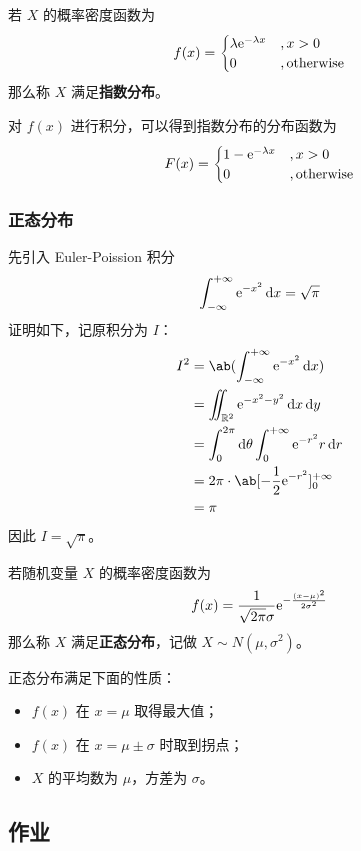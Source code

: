 \begin{definition}
    若 $X$ 的概率密度函数为
    $$
    f(x) = \begin{cases}
        \lambda \mathrm{e}^{-\lambda x} &, x > 0 \\
        0 &, \text{otherwise}
    \end{cases}
    $$
    那么称 $X$ 满足\textbf{指数分布}。
\end{definition}

对 $f(x)$ 进行积分，可以得到指数分布的分布函数为
$$
F(x) = \begin{cases}
    1 - \mathrm{e}^{-\lambda x} &, x > 0 \\
    0 &, \text{otherwise}
\end{cases}
$$

\subsubsection{正态分布}

先引入 Euler-Poission 积分
$$
\int_{- \infty}^{+ \infty} \mathrm{e}^{-x^2} \dd{x} = \sqrt{\pi}
$$
证明如下，记原积分为 $I$：
$$
\begin{aligned}
    I^2 & = \ab(\int_{-\infty}^{+ \infty} \E^{-x^2} \dd{x}) \\
    & = \iint_{\mathbb{R}^2} \E^{-x^2 - y^2} \dd{x} \dd{y} \\
    & = \int_{0}^{2\pi} \dd{\theta} \int_{0}^{+\infty} \E^{-r^2} r \dd{r} \\
    & = 2\pi \cdot \ab[-\frac{1}{2} \E^{-r^2}]_{0}^{+\infty} \\
    & = \pi
\end{aligned}
$$
因此 $I = \sqrt{\pi}$。

\begin{definition}[正态分布]
    若随机变量 $X$ 的概率密度函数为
    $$
    f(x) = \frac{1}{\sqrt{2\pi} \sigma} \mathrm{e}^{-\frac{(x - \mu)^2}{2 \sigma^2}}
    $$
    那么称 $X$ 满足\textbf{正态分布}，记做 $X \sim N(\mu, \sigma^2)$。
\end{definition}

正态分布满足下面的性质：

\begin{itemize}
    \item $f(x)$ 在 $x = \mu$ 取得最大值；
    \item $f(x)$ 在 $x = \mu \pm \sigma$ 时取到拐点；
    \item $X$ 的平均数为 $\mu$，方差为 $\sigma$。
\end{itemize}

\subsection{作业}

